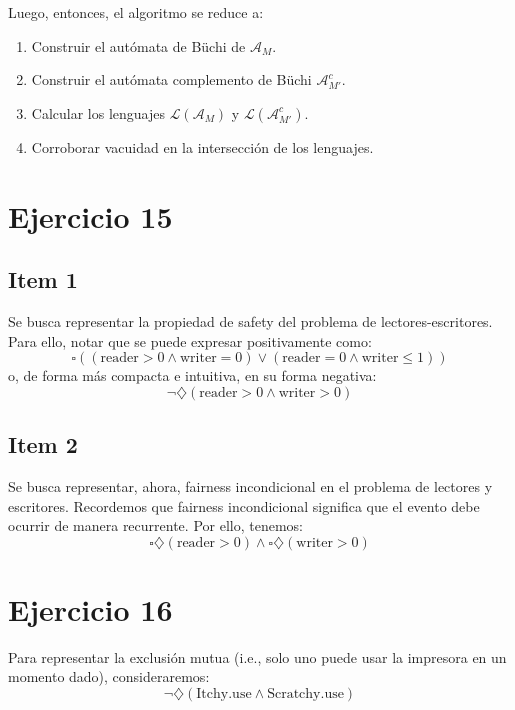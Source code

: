 \documentclass{article}
\begin{document}
Luego, entonces, el algoritmo se reduce a:
\begin{enumerate}
	\item Construir el autómata de Büchi de $\mathcal{A}_M$.
	\item Construir el autómata complemento de Büchi $\mathcal{A}^c_{M'}$.
	\item Calcular los lenguajes $\mathcal{L}(\mathcal{A}_M)$ y $\mathcal{L}(\mathcal{A}^c_{M'})$.
	\item Corroborar vacuidad en la intersección de los lenguajes.
\end{enumerate}

\section*{Ejercicio 15}

\subsection*{Item 1}
Se busca representar la propiedad de safety del problema de lectores-escritores.
Para ello, notar que se puede expresar positivamente como:
\begin{equation*}
	\square((\text{reader} > 0 \land \text{writer} = 0) \lor (\text{reader} = 0 \land \text{writer} \leq 1))
\end{equation*}
o, de forma más compacta e intuitiva, en su forma negativa:
\begin{equation*}
	\neg\diamondsuit(\text{reader} > 0 \land \text{writer} > 0)
\end{equation*}

\subsection*{Item 2}
Se busca representar, ahora, fairness incondicional en el problema de lectores y escritores.
Recordemos que fairness incondicional significa que el evento debe ocurrir de manera recurrente.
Por ello, tenemos:
\begin{equation*}
	\square\diamondsuit(\text{reader} > 0) \land \square\diamondsuit(\text{writer} > 0)
\end{equation*}

\section*{Ejercicio 16}
Para representar la exclusión mutua (i.e., solo uno puede usar la impresora en un momento dado), consideraremos:
\begin{equation*}
	\neg\diamondsuit(\text{Itchy.use} \land \text{Scratchy.use})
\end{equation*}
\end{document}
